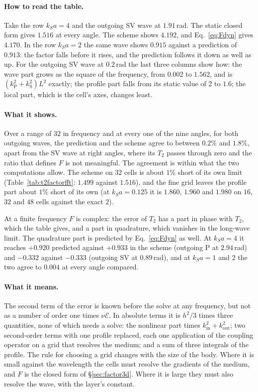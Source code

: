 \documentclass[11pt,a4paper]{article}
\newcommand{\cE}{\mathcal{E}}
\begin{document}
\paragraph{How to read the table.} Take the row $k_Sa=4$ and the outgoing SV wave at $1.91$\,rad. The
static closed form gives $1.516$ at every angle. The scheme shows $4.192$, and Eq.~\eqref{eq:Fdyn} gives
$4.170$. In the row $k_Sa=2$ the same wave shows $0.915$ against a prediction of $0.913$: the factor falls
before it rises, and the prediction follows it down as well as up. For the outgoing SV wave at $0.2$\,rad
the last three columns show how: the wave part grows as the square of the frequency, from $0.002$ to
$1.562$, and is $(k_{\mathrm{P}}^2+k_{\mathrm{S}}^2)L^2$ exactly; the profile part falls from its static
value of $2$ to $1.6$; the local part, which is the cell's axes, changes least.

\paragraph{What it shows.} Over a range of $32$ in frequency and at every one of the nine angles, for
both outgoing waves, the prediction and the scheme agree to between $0.2\%$ and $1.8\%$, apart from the SV
wave at right angles, where its $T_2$ passes through zero and the ratio that defines $F$ is not
meaningful. The agreement is within what the two computations allow. The scheme on $32$ cells is about
$1\%$ short of its own limit (Table~\ref{tab:t2factorfft}: $1.499$ against $1.516$), and the fine grid
leaves the profile part about $1\%$ short of its own (at $k_Sa=0.125$ it is $1.860$, $1.960$ and $1.980$
on $16$, $32$ and $48$ cells against the exact $2$).

At a finite frequency $F$ is complex: the error of $T_2$ has a part in phase with $T_2$, which the table
gives, and a part in quadrature, which vanishes in the long-wave limit. The quadrature part is predicted
by Eq.~\eqref{eq:Fdyn} as well. At $k_Sa=4$ it reaches $+0.920$ predicted against $+0.933$ in the scheme
(outgoing P at $2.94$\,rad) and $-0.332$ against $-0.333$ (outgoing SV at $0.89$\,rad), and at $k_Sa=1$
and $2$ the two agree to $0.004$ at every angle compared.

\paragraph{What it means.} The second term of the error is known before the solve at any frequency, but
not as a number of order one times $\nu\cE$. In absolute terms it is $h^2/3$ times three quantities, none
of which needs a solve: the nonlinear part times $k_{\mathrm{in}}^2+k_{\mathrm{out}}^2$; two second-order
terms with one profile replaced, each one application of the coupling operator on a grid that resolves
the medium; and a sum of three integrals of the profile. The rule for choosing a grid changes with the
size of the body. Where it is small against the wavelength the cells must resolve the gradients of the
medium, and $F$ is the closed form of \S\ref{sec:factor3d}. Where it is large they must also resolve the
wave, with the layer's constant.
\end{document}
